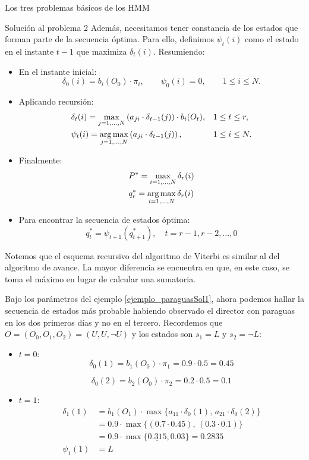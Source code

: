 \begin{section}{Los tres problemas básicos de los HMM}
\begin{subsection}{Solución al problema 2}
Además, necesitamos tener constancia de los estados que forman parte de la secuencia óptima. Para ello, definimos $\psi_t(i)$ como el estado en el instante $t-1$ que maximiza $\delta_t(i)$. Resumiendo:
\begin{itemize}
    \item En el instante inicial:
    \begin{equation*}
        \delta_0(i)=b_i(O_0)\cdot\pi_i, \qquad \psi_0(i)=0, \qquad 1\leq i\leq N.
    \end{equation*}
    \item Aplicando recursión:
    \begin{align*}
        &\delta_t(i)=\max_{j=1,\dots,N}\left(a_{ji}\cdot\delta_{t-1}(j)\right) \cdot b_i(O_t), && 1\leq t\leq r, \\
        &\psi_t(i)=\operatorname*{\arg\max}_{j=1,\dots,N}\left(a_{ji}\cdot\delta_{t-1}(j)\right),  &&  1\leq i\leq N.
    \end{align*}
    \item Finalmente:
    \begin{align*}
        & P^* = \max_{i=1,\dots,N} \delta_r(i)\\
        & q_r^*=\operatorname*{\arg\max}_{i=1,\dots,N} \delta_r(i)
    \end{align*} 
    \item Para encontrar la secuencia de estados óptima:
    \[q_t^*=\psi_{t+1}(q_{t+1}^*), \quad t=r-1,r-2,\dots,0\]
\end{itemize}
Notemos que el esquema recursivo del algoritmo de Viterbi es similar al del algoritmo de avance. La mayor diferencia se encuentra en que, en este caso, se toma el máximo en lugar de calcular una sumatoria.

\begin{exampleth}
Bajo los parámetros del ejemplo \ref{ejemplo_paraguasSol1}, ahora podemos hallar la secuencia de estados más probable habiendo observado el director con paraguas en los dos primeros días y no en el tercero. Recordemos que $O=(O_0,O_1,O_2)=(U,U,\neg U)$ y los estados son $s_1=L$ y $s_2=\neg L$:
\begin{itemize}
    \item $t=0$:
    \[\delta_0(1)=b_1(O_0)\cdot\pi_1=0.9\cdot0.5=0.45\]
    
    \[\delta_0(2)=b_2(O_0)\cdot\pi_2=0.2\cdot0.5=0.1\]
    
    \item $t=1$:
    \[\begin{aligned}
        \delta_1(1)&=b_1(O_1)\cdot\max\{a_{11}\cdot\delta_0(1),\,a_{21}\cdot\delta_0(2)\}\\
        &=0.9\cdot\max\{(0.7\cdot0.45),\,(0.3\cdot0.1)\}\\
        &=0.9\cdot\max\{\underline{0.315},0.03\}=0.2835\\
        \psi_1(1)&=L
    \end{aligned}\]
    

\end{itemize}
\end{exampleth}
\end{subsection}
\end{section}
